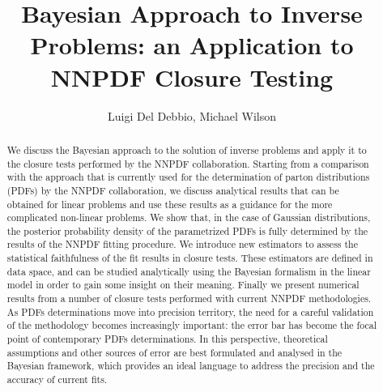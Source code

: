 \documentclass[11pt]{article}
\title{Bayesian Approach to Inverse Problems: an Application to NNPDF Closure Testing}
\author{Luigi Del Debbio, Michael Wilson}
\begin{document}
\maketitle

\begin{abstract}
    We discuss the Bayesian approach to the solution of inverse problems and apply it to the
    closure tests performed by the NNPDF collaboration. Starting from a comparison with
    the approach that is currently used for the determination of parton distributions 
    (PDFs) by the NNPDF collaboration, we discuss analytical results that can be obtained for 
    linear problems and use these results as a guidance for the more complicated non-linear problems. 
    We show that, in the case of Gaussian distributions, the posterior probability density
    of the parametrized PDFs is fully determined by the results of the NNPDF fitting procedure. 
    We introduce new estimators to assess the statistical faithfulness of the fit results in 
    closure tests. These estimators are defined in data space, and can be studied analytically 
    using the Bayesian formalism in the linear model in order to gain some insight on their
    meaning. Finally we present numerical results from a number of closure tests performed 
    with current NNPDF methodologies. As PDFs determinations move into precision territory, 
    the need for a careful validation of the methodology becomes increasingly important: the error
    bar has become the focal point of contemporary PDFs determinations. In this perspective,
    theoretical assumptions and other sources of error are best formulated and analysed
    in the Bayesian framework, which provides an ideal language to address the 
    precision and the accuracy of current fits. 

\end{abstract}





%
%


\appendix





\end{document}
